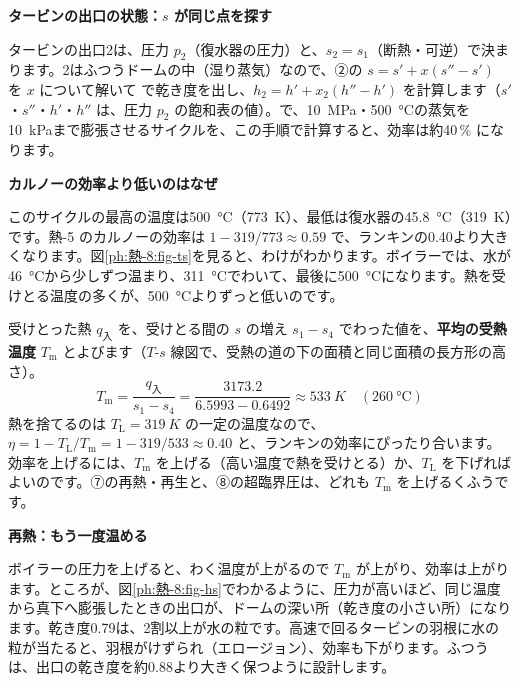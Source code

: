 \noindent\textbf{タービンの出口の状態：$s$ が同じ点を探す}\par\nobreak
タービンの出口2は、圧力 $p_2$（復水器の圧力）と、$s_2=s_1$（断熱・可逆）で決まります。2はふつうドームの中（湿り蒸気）なので、②の $s=s'+x(s''-s')$ を $x$ について解いて
で乾き度を出し、$h_2=h'+x_2(h''-h')$ を計算します（$s'$・$s''$・$h'$・$h''$ は、圧力 $p_2$ の飽和表の値）。で、\qty{10}{MPa}・\qty{500}{\celsius}の蒸気を\qty{10}{kPa}まで膨張させるサイクルを、この手順で計算すると、効率は約40\,\% になります。

\noindent\textbf{カルノーの効率より低いのはなぜ}\par\nobreak
このサイクルの最高の温度は\qty{500}{\celsius}（\qty{773}{K}）、最低は復水器の\qty{45.8}{\celsius}（\qty{319}{K}）です。熱-5 のカルノーの効率は $1-319/773\approx0.59$ で、ランキンの0.40より大きくなります。図\ref{ph:熱-8:fig-ts}を見ると、わけがわかります。ボイラーでは、水が\qty{46}{\celsius}から少しずつ温まり、\qty{311}{\celsius}でわいて、最後に\qty{500}{\celsius}になります。熱を受けとる温度の多くが、\qty{500}{\celsius}よりずっと低いのです。

受けとった熱 $q_{\text{入}}$ を、受けとる間の $s$ の増え $s_1-s_4$ でわった値を、\textbf{平均の受熱温度} $T_{\mathrm m}$ とよびます（$T$-$s$ 線図で、受熱の道の下の面積と同じ面積の長方形の高さ）。
\[ T_{\mathrm m}=\frac{q_{\text{入}}}{s_1-s_4}=\frac{3173.2}{6.5993-0.6492}\approx\qty{533}{K}\quad(\qty{260}{\celsius}) \]
熱を捨てるのは $T_{\mathrm L}=\qty{319}{K}$ の一定の温度なので、$\eta=1-T_{\mathrm L}/T_{\mathrm m}=1-319/533\approx0.40$ と、ランキンの効率にぴったり合います。効率を上げるには、$T_{\mathrm m}$ を上げる（高い温度で熱を受けとる）か、$T_{\mathrm L}$ を下げればよいのです。⑦の再熱・再生と、⑧の超臨界圧は、どれも $T_{\mathrm m}$ を上げるくふうです。


\noindent\label{ph:熱-8:sec7}\textbf{再熱：もう一度温める}\par\nobreak
ボイラーの圧力を上げると、わく温度が上がるので $T_{\mathrm m}$ が上がり、効率は上がります。ところが、図\ref{ph:熱-8:fig-hs}でわかるように、圧力が高いほど、同じ温度から真下へ膨張したときの出口が、ドームの深い所（乾き度の小さい所）になります。乾き度0.79は、2割以上が水の粒です。高速で回るタービンの羽根に水の粒が当たると、羽根がけずられ（エロージョン）、効率も下がります。ふつうは、出口の乾き度を約0.88より大きく保つように設計します。

